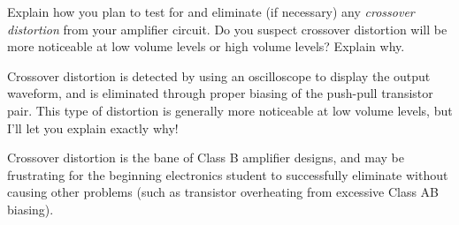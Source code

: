 

Explain how you plan to test for and eliminate (if necessary) any {\it crossover distortion} from your amplifier circuit.  Do you suspect crossover distortion will be more noticeable at low volume levels or high volume levels?  Explain why.







Crossover distortion is detected by using an oscilloscope to display the output waveform, and is eliminated through proper biasing of the push-pull transistor pair.  This type of distortion is generally more noticeable at low volume levels, but I'll let you explain exactly why!







Crossover distortion is the bane of Class B amplifier designs, and may be frustrating for the beginning electronics student to successfully eliminate without causing other problems (such as transistor overheating from excessive Class AB biasing).



